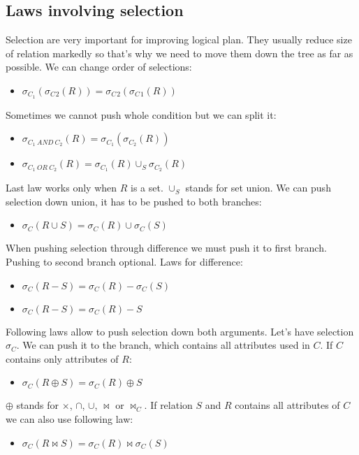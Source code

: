 \subsection{Laws involving selection}

Selection are very important for improving logical plan. They usually reduce size of relation markedly so that's why we need to move them down the tree as far as possible.
We can change order of selections:

\begin{itemize}
\item $\sigma_{C_1}(\sigma_C{_2}(R)) = \sigma_C{_2}(\sigma_C{_1}(R))$
\end{itemize}
Sometimes we cannot push whole condition but we can split it:

\begin{itemize}
\item $\sigma_{C_1~AND~C_2}(R)=\sigma_{C_1}(\sigma_{C_2}(R))$

\item $\sigma_{C_1~OR~C_2}(R)=\sigma_{C_1}(R) \cup_S \sigma_{C_2}(R)$
\end{itemize}
Last law works only when $R$ is a set. $\cup_S$ stands for set union. We can push selection down union, it has to be pushed to both branches:
\begin{itemize}
\item $\sigma_{C}(R \cup S)=\sigma_{C}(R) \cup \sigma_{C}(S)$
\end{itemize}

When pushing selection through difference we must push it to first branch. Pushing to second branch optional. Laws for difference: 
\begin{itemize}
\item $\sigma_{C}(R-S)=\sigma_{C}(R) - \sigma_{C}(S)$
\item $\sigma_{C}(R-S)=\sigma_{C}(R) - S$
\end{itemize}

Following laws allow to push selection down both arguments. Let's have selection $\sigma_C$. We can push it to the branch, which contains all attributes used in $C$. If $C$ contains only attributes of $R$:
\begin{itemize}
\item $\sigma_{C}(R \oplus S)=\sigma_{C}(R) \oplus S$
\end{itemize}
$\oplus$ stands for $\times$, $\cap$, $\cup$, $\Join$ or $\Join_C$. If relation $S$ and $R$ contains all attributes of $C$ we can also use following law:
\begin{itemize}
\item $\sigma_{C}(R \Join S)=\sigma_{C}(R) \Join  \sigma_{C}(S)$
\end{itemize}


